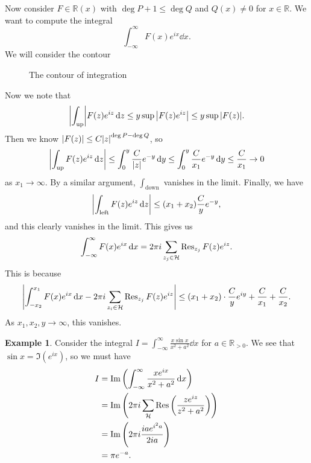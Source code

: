 \documentclass[leqno, openany]{memoir}
\theoremstyle{definition}
\newtheorem{exm}[thm]{Example}
\theoremstyle{remark}
\theoremstyle{plain}
\theoremstyle{definition}
\theoremstyle{remark}
\newcommand{\R}{\mathbb{R}}
\newcommand{\mc}[1]{\mathcal{#1}}
\begin{document}
Now consider $F \in \R(x)$ with $\deg P + 1 \leq \deg Q$ and $Q(x) \neq 0$ for $x \in \R$. We want to compute the integral
\[ \int_{- \infty}^{\infty} F(x) e^{ix} \dd{x}. \]
We will consider the contour
\begin{figure}[H]
\begin{center}
\end{center}
\caption{The contour of integration}%
\label{fig:}
\end{figure}

Now we note that 
\[ \abs{\int_{\text{up}}} F(z) e^{iz} \dd{z} \leq y \sup \abs{F(z) e^{iz}} \leq y \sup \abs{F(z)}. \]
Then we know $\abs{F(z)} \leq C \abs{z}^{\deg P - \deg Q}$, so
\[ \abs{\int_{\text{up}} F(z) e^{iz} \dd{z}} \leq \int_0^y \frac{C}{\abs{z}} e^{-y} \dd{y} \leq \int_0^y \frac{C}{x_1} e^{-y} \dd{y} \leq \frac{C}{x_1} \to 0 \]
as $x_1 \to \infty$. By a similar argument, $\int_{\text{down}}$ vanishes in the limit. Finally, we have
\[ \abs{\int_{\text{left}} F(z) e^{iz} \dd{z}} \leq (x_1 + x_2) \frac{C}{y} e^{-y}, \]
and this clearly vanishes in the limit. This gives us
\[ \int_{- \infty}^{\infty} F(x) e^{ix} \dd{x} = 2 \pi i \sum_{{z_j \in \mc{H}}} \Res_{z_j} F(z) e^{iz}. \]
This is because 
\[ \abs{\int_{-x_2}^{x_1} F(x) e^{ix} \dd{x} - 2 \pi i \sum_{z_i \in \mc{H}} \Res_{z_j} F(z)e^{iz}} \leq (x_1 + x_2) \cdot \frac{C}{y}e^{iy} + \frac{C}{x_1} + \frac{C}{x_2}. \]
As $x_1, x_2, y \to \infty$, this vanishes.

\begin{exm}
    Consider the integral $I = \int_{- \infty}^{\infty} \frac{x \sin x}{x^2 + a^2} \dd{x}$ for $a \in \R_{>0}$. We see that $\sin x = \Im(e^{ix})$, so we must have
    \begin{align*}
        I &= \Im\qty(\int_{-\infty}^{\infty} \frac{xe^{ix}}{x^2+a^2} \dd{x}) \\
          &= \Im \qty(2 \pi i \sum_{\mc{H}} \Res \qty(\frac{ze^{iz}}{z^2 + a^2})) \\
          &= \Im\qty(2 \pi i \frac{ia e^{i^2a}}{2ia}) \\
          &= \pi e^{-a}.
    \end{align*}
\end{exm}
\end{document}
